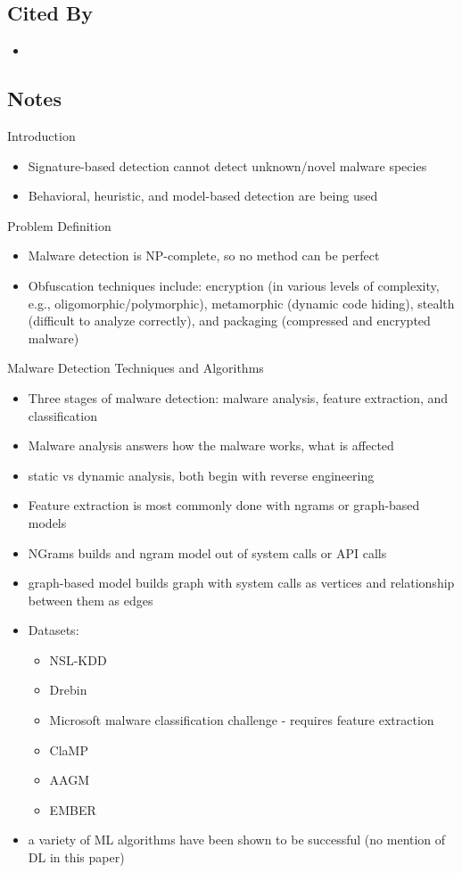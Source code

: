 \documentclass{article}
\begin{document}
\subsection*{Cited By}
\begin{itemize}
\item
\end{itemize}

\subsection*{Notes}

Introduction
\begin{itemize}
	\item Signature-based detection cannot detect unknown/novel malware species
	\item Behavioral, heuristic, and model-based detection are being used
\end{itemize}
Problem Definition
\begin{itemize}
	\item Malware detection is NP-complete, so no method can be perfect
	\item Obfuscation techniques include: encryption (in various levels of complexity, e.g., oligomorphic/polymorphic), metamorphic (dynamic code hiding), stealth (difficult to analyze correctly), and packaging (compressed and encrypted malware)
\end{itemize}
Malware Detection Techniques and Algorithms
\begin{itemize}
\item Three stages of malware detection: malware analysis, feature extraction, and classification
\item Malware analysis answers how the malware works, what is affected
\item static vs dynamic analysis, both begin with reverse engineering
\item Feature extraction is most commonly done with ngrams or graph-based models
\item NGrams builds and ngram model out of system calls or API calls
\item graph-based model builds graph with system calls as vertices and relationship between them as edges
\item Datasets:
	\begin{itemize}
	\item NSL-KDD
	\item Drebin
	\item Microsoft malware classification challenge - requires feature extraction
	\item ClaMP 
	\item AAGM
	\item EMBER
	\end{itemize}
\item a variety of ML algorithms have been shown to be successful (no mention of DL in this paper)
\end{itemize}
\end{document}
